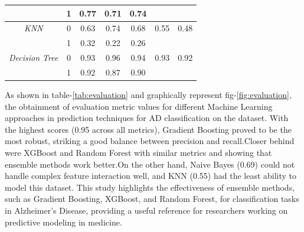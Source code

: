 \documentclass[conference]{IEEEtran} %
\begin{document}
\begin{table}[H]
{\begin{tabular}{|c|c|c|c|c|c|c|}
                                              & 1                                        & 0.77                                         & 0.71                                      & 0.74                                        &                                                 &                         \\ \hline
\multirow{}{}{\textit{KNN}}                 & 0                                        & 0.63                                         & 0.74                                      & 0.68                                        & \multirow{}{}{0.55}                           & \multirow{}{}{0.48}   \\
                                              & 1                                        & 0.32                                         & 0.22                                      & 0.26                                        &                                                 &                         \\ \hline
\multirow{}{}{\textit{Decision Tree}}       & 0                                        & 0.93                                         & 0.96                                      & 0.94                                        & \multirow{}{}{0.93}                           & \multirow{}{}{0.92}   \\
                                              & 1                                        & 0.92                                         & 0.87                                      & 0.90                                        &                                                 &                         \\ \hline
\end{tabular}
}
\end{table}
\FloatBarrier




As shown in table-\ref{tab:evaluation} and graphically represent fig-\ref{fig:evaluation}, the obtainment of evaluation metric values for different Machine Learning approaches in prediction techniques for AD classification on the dataset. With the highest scores (0.95 across all metrics), Gradient Boosting proved to be the most robust, striking a good balance between precision and recall.Closer behind were XGBoost and Random Forest with similar metrics and showing that ensemble methods work better.On the other hand, Naive Bayes (0.69) could not handle complex feature interaction well, and KNN (0.55) had the least ability to model this dataset. This study highlights the effectiveness of ensemble methods, such as Gradient Boosting, XGBoost, and Random Forest, for classification tasks in Alzheimer’s Disease, providing a useful reference for researchers working on predictive modeling in medicine.
\end{document}
